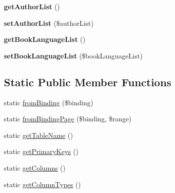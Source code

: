 \begin{DoxyCompactItemize}
\item 
\hypertarget{classBook_a6321d8c999c82a60e10863487edccc5f}{
{\bfseries getAuthorList} ()}
\label{classBook_a6321d8c999c82a60e10863487edccc5f}

\item 
\hypertarget{classBook_a1f56acc7049b6564d95706d8a0c30793}{
{\bfseries setAuthorList} (\$authorList)}
\label{classBook_a1f56acc7049b6564d95706d8a0c30793}

\item 
\hypertarget{classBook_ac09af067ad1ff35f374282bc405dd427}{
{\bfseries getBookLanguageList} ()}
\label{classBook_ac09af067ad1ff35f374282bc405dd427}

\item 
\hypertarget{classBook_af280a15556b5368067fc42b964a71554}{
{\bfseries setBookLanguageList} (\$bookLanguageList)}
\label{classBook_af280a15556b5368067fc42b964a71554}

\end{DoxyCompactItemize}
\subsection*{Static Public Member Functions}
\begin{DoxyCompactItemize}
\item 
static \hyperlink{classBook_af0d410f2c2da5f56b57c8f3e59d799a6}{fromBinding} (\$binding)
\item 
static \hyperlink{classBook_a4ec502681f3507edb7c64bb012463d33}{fromBindingPage} (\$binding, \$range)
\item 
static \hyperlink{classBook_ae4b3d3747fad76af4e4724a4bcf749a3}{getTableName} ()
\item 
static \hyperlink{classBook_ae2a08ea5916ed402169f59b6ad853d13}{getPrimaryKeys} ()
\item 
static \hyperlink{classBook_a26e48647691c869f9de967b1e5e2e49d}{getColumns} ()
\item 
static \hyperlink{classBook_afeabb3df0ca3af21d93d2c6d2be84fe6}{getColumnTypes} ()
\end{DoxyCompactItemize}
